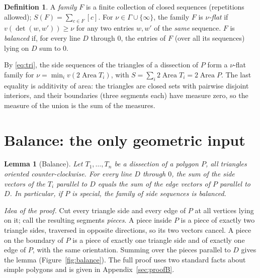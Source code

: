 \documentclass[11pt]{article}
\newtheorem{lemma}[theorem]{Lemma}
\theoremstyle{definition}
\newtheorem{definition}[theorem]{Definition}
\newcommand{\Area}{\operatorname{Area}}
\newcommand{\ar}[1]{[#1]}
\begin{document}
\begin{definition}\label{def:family}
A \emph{family} $F$ is a finite collection of closed sequences (repetitions allowed); $S(F)=\sum_{c\in F}\ar c$. For
$\nu\in\Gamma\cup\{\infty\}$, the family $F$ is \emph{$\nu$-flat} if $v(\det(w,w'))\ge\nu$ for any two
entries $w,w'$ of the \emph{same} sequence. $F$ is \emph{balanced} if, for every line $D$ through
$0$, the entries of $F$ (over all its sequences) lying on $D$ sum to $0$.
\end{definition}

By \eqref{eq:tri}, the side sequences of the triangles of a dissection of $P$ form a $\nu$-flat
family for $\nu=\min_iv(2\Area T_i)$, with $S=\sum_i2\Area T_i=2\Area P$. The last equality is
additivity of area: the triangles are closed sets with pairwise disjoint interiors, and their
boundaries (three segments each) have measure zero, so the measure of the union is the sum of the
measures.

\section{Balance: the only geometric input}\label{sec:balance}

\begin{lemma}[Balance]\label{lem:B}
Let $T_1,\dots,T_n$ be a dissection of a polygon $P$, all triangles oriented counter-clockwise. For
every line $D$ through $0$, the sum of the side vectors of the $T_i$ parallel to $D$ equals the sum
of the edge vectors of $P$ parallel to $D$. In particular, if $P$ is special, the family of side
sequences is balanced.
\end{lemma}

\emph{Idea of the proof.} Cut every triangle side and every edge of $P$ at all vertices lying
on it; call the resulting segments \emph{pieces}. A piece inside $P$ is a piece of exactly two
triangle sides, traversed in opposite directions, so its two vectors cancel. A piece on the
boundary of $P$ is a piece of exactly one triangle side and of exactly one edge of $P$, with the
same orientation. Summing over the pieces parallel to $D$ gives the lemma (Figure~\ref{fig:balance}).
The full proof uses two standard facts about simple polygons and is given in
Appendix~\ref{sec:proofB}.
\end{document}
